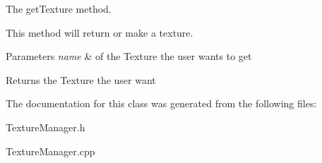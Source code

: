 The get\+Texture method. 

This method will return or make a texture. 
\begin{DoxyParams}{Parameters}
{\em name} & of the Texture the user wants to get \\
\hline
\end{DoxyParams}
\begin{DoxyReturn}{Returns}
the Texture the user want 
\end{DoxyReturn}


The documentation for this class was generated from the following files\+:\begin{DoxyCompactItemize}
\item 
Texture\+Manager.\+h\item 
Texture\+Manager.\+cpp\end{DoxyCompactItemize}
